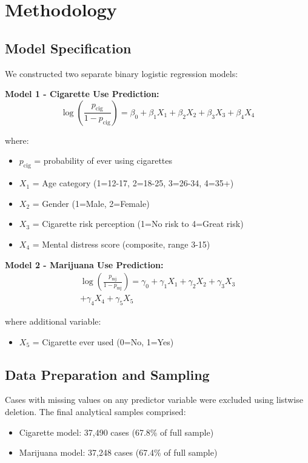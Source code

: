 \documentclass[conference]{IEEEtran}
\begin{document}
\section{Methodology}

\subsection{Model Specification}

We constructed two separate binary logistic regression models:

\textbf{Model 1 - Cigarette Use Prediction:}
\begin{equation}
\log\left(\frac{p_{\text{cig}}}{1-p_{\text{cig}}}\right) = \beta_0 + \beta_1X_1 + \beta_2X_2 + \beta_3X_3 + \beta_4X_4
\end{equation}

where:
\begin{itemize}
    \item $p_{\text{cig}}$ = probability of ever using cigarettes
    \item $X_1$ = Age category (1=12-17, 2=18-25, 3=26-34, 4=35+)
    \item $X_2$ = Gender (1=Male, 2=Female)
    \item $X_3$ = Cigarette risk perception (1=No risk to 4=Great risk)
    \item $X_4$ = Mental distress score (composite, range 3-15)
\end{itemize}

\textbf{Model 2 - Marijuana Use Prediction:}
\begin{equation}
\begin{split}
\log\left(\frac{p_{\text{mj}}}{1-p_{\text{mj}}}\right) = \gamma_0 + \gamma_1X_1 + \gamma_2X_2 + \gamma_3X_3 \\ + \gamma_4X_4 + \gamma_5X_5
\end{split}
\end{equation}

where additional variable:
\begin{itemize}
    \item $X_5$ = Cigarette ever used (0=No, 1=Yes)
\end{itemize}

\subsection{Data Preparation and Sampling}

Cases with missing values on any predictor variable were excluded using listwise deletion. The final analytical samples comprised:
\begin{itemize}
    \item Cigarette model: 37,490 cases (67.8\% of full sample)
    \item Marijuana model: 37,248 cases (67.4\% of full sample)
\end{itemize}
\end{document}
